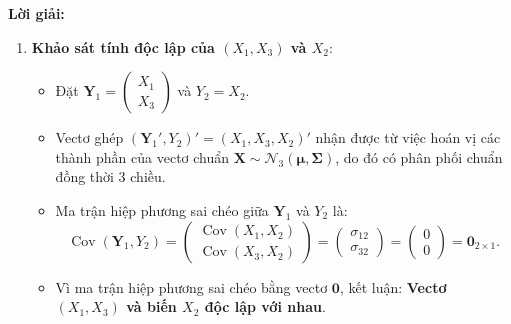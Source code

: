 \documentclass[11pt,a4paper]{article}
\newenvironment{solution}{%
  \par\noindent\textbf{Lời giải:}\ \ignorespaces
}{\par}
\theoremstyle{definition}
\begin{document}
\begin{solution}
\begin{enumerate}[label=\textbf{\alph*)}]
  \item \textbf{Khảo sát tính độc lập của $(X_1, X_3)$ và $X_2$}:
  \begin{itemize}
    \item Đặt $\mathbf{Y}_1 = \begin{pmatrix} X_1 \\ X_3 \end{pmatrix}$ và $Y_2 = X_2$.
    \item Vectơ ghép $(\mathbf{Y}_1', Y_2)' = (X_1, X_3, X_2)'$ nhận được từ việc hoán vị các thành phần của vectơ chuẩn $\mathbf{X} \sim \mathcal{N}_3(\boldsymbol{\mu}, \boldsymbol{\Sigma})$, do đó có phân phối chuẩn đồng thời 3 chiều.
    \item Ma trận hiệp phương sai chéo giữa $\mathbf{Y}_1$ và $Y_2$ là:
    \[
    \operatorname{Cov}(\mathbf{Y}_1, Y_2) = \begin{pmatrix} \operatorname{Cov}(X_1, X_2) \\ \operatorname{Cov}(X_3, X_2) \end{pmatrix} = \begin{pmatrix} \sigma_{12} \\ \sigma_{32} \end{pmatrix} = \begin{pmatrix} 0 \\ 0 \end{pmatrix} = \mathbf{0}_{2 \times 1}.
    \]
    \item Vì ma trận hiệp phương sai chéo bằng vectơ $\mathbf{0}$, kết luận: \textbf{Vectơ $(X_1, X_3)$ và biến $X_2$ độc lập với nhau}.
  \end{itemize}


\end{enumerate}
\end{solution}
\end{document}
